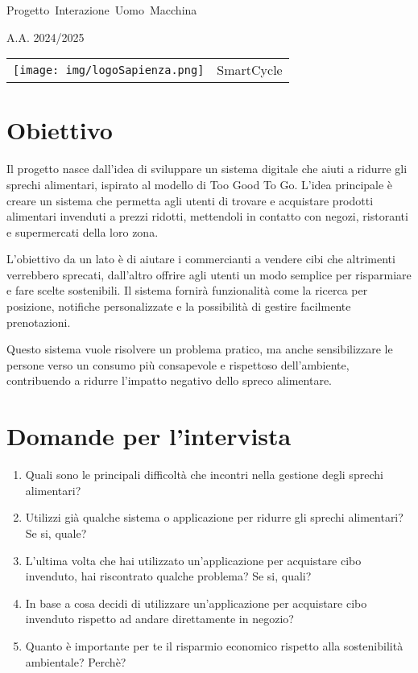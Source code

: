 \documentclass{article}
\author{Alessandro Dori}
\date{\today}
\begin{document}
\hbox{\Huge Progetto Interazione Uomo Macchina}
\begin{center}
    \Huge A.A. 2024/2025
\end{center}

\begin{center}
    \begin{tabular}{c c}
        \texttt{[image: img/logoSapienza.png]} & \huge SmartCycle \\
    \end{tabular}
\end{center}

\section*{Obiettivo}
Il progetto nasce dall'idea di sviluppare un sistema digitale che aiuti a ridurre gli sprechi alimentari, ispirato al modello di Too Good To Go. 
L’idea principale è creare un sistema che permetta agli utenti di trovare e acquistare prodotti alimentari invenduti a prezzi ridotti, mettendoli in contatto con negozi, ristoranti e supermercati della loro zona.

L’obiettivo da un lato è di aiutare i commercianti a vendere cibi che altrimenti verrebbero sprecati, dall’altro offrire agli utenti un modo semplice per risparmiare e fare scelte sostenibili. 
Il sistema fornirà funzionalità come la ricerca per posizione, notifiche personalizzate e la possibilità di gestire facilmente prenotazioni.

Questo sistema vuole risolvere un problema pratico, ma anche sensibilizzare le persone verso un consumo più consapevole e rispettoso dell’ambiente, contribuendo a ridurre l’impatto negativo dello spreco alimentare.

\section*{Domande per l'intervista}
\begin{enumerate}
    \item Quali sono le principali difficoltà che incontri nella gestione degli sprechi alimentari?
    \item Utilizzi già qualche sistema o applicazione per ridurre gli sprechi alimentari? Se si, quale?
    \item L'ultima volta che hai utilizzato un'applicazione per acquistare cibo invenduto, hai riscontrato qualche problema? Se si, quali?
    \item In base a cosa decidi di utilizzare un'applicazione per acquistare cibo invenduto rispetto ad andare direttamente in negozio?
    \item Quanto è importante per te il risparmio economico rispetto alla sostenibilità ambientale? Perchè?
\end{enumerate}
\end{document}
